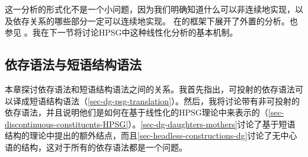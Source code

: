 这一分析的形式化不是一个小问题，因为我们明确知道什么可以非连续地实现，以及依存关系的哪些部分一定可以连续地实现。
 \citet{KP95a}在\hpsgc 的框架下展开了外置的分析。也参见 。我在下一节将讨论HPSG中这种线性化分析的基本机制。

\subsection{依存语法与短语结构语法}
\label{sec-dependency-vs-constituency}

本章探讨依存语法和短语结构语法之间的关系。我首先指出，可投射的依存语法可以译成短语结构语法（\ref{sec-dg-psg-translation}）。然后，我将讨论带有非可投射的依存语法，并且说明他们是如何在基于线性化的HPSG理论中来表示的（\ref{sec-discontinuous-constituents-HPSG}）。\ref{sec-dg-daughters-mothers}讨论了基于短语结构的理论中提出的额外结点，而且\ref{sec-headless-constructions-dg}讨论了无中心语的结构，这对于所有的依存语法都是一个问题。

